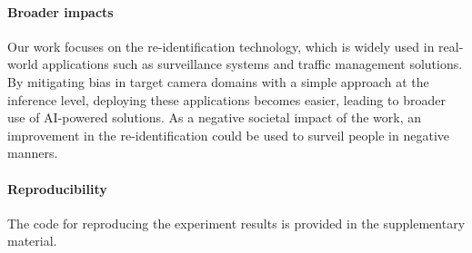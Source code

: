 \paragraph{Broader impacts}
Our work focuses on the re-identification technology, which is widely used in real-world applications such as surveillance systems and traffic management solutions.
By mitigating bias in target camera domains with a simple approach at the inference level, deploying these applications becomes easier, leading to broader use of AI-powered solutions.
As a negative societal impact of the work, an improvement in the re-identification could be used to surveil people in negative manners.

\paragraph{Reproducibility}
The code for reproducing the experiment results is provided in the supplementary material.


